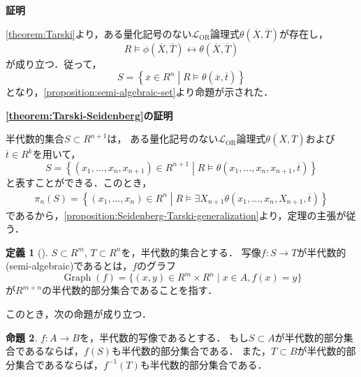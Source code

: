\documentclass[uplatex, dvipdfmx]{jsarticle}
\makeatletter
\numberwithin{equation}{section}
\renewenvironment{proof}[1][\proofname]{\par
  \pushQED{\qed}%
  \normalfont \topsep6\p@\@plus6\p@\relax
  \trivlist
  \item\relax
  {\bfseries
  #1\@addpunct{.}}\hspace\labelsep\ignorespaces
}{
  \popQED\endtrivlist\@endpefalse
}
\newcommand{\map}[3]{{#1}\colon{#2}\rightarrow{#3}}
\DeclareMathOperator{\Graph}{Graph}
\theoremstyle{definition}
\newtheorem{definition}{定義}[section]
\newtheorem{proposition}[definition]{命題}
\renewcommand{\proofname}{\textbf{証明}}
\makeatother
\begin{document}
\begin{proof}
     \cref{theorem:Tarski}より，ある量化記号のない$\mathcal{L}_\mathrm{OR}$論理式$\theta\left(\overline{X}, \overline{T}\right)$が存在し，
     \begin{equation}
          R \models \phi\left(\overline{X},\overline{T}\right) \leftrightarrow \theta\left(\overline{X}, \overline{T}\right)
     \end{equation}
     が成り立つ．従って，
     \begin{equation}
          S = \left\{ \overline{x} \in R^n \middle| R \models \theta(\overline{x}, \overline{t}) \right\}
     \end{equation}
     となり，\cref{proposition:semi-algebraic-set}より命題が示された．
\end{proof}

\begin{proof}[\cref{theorem:Tarski-Seidenberg}の証明]
     半代数的集合$S \subset R^{n+1}$は，
     ある量化記号のない$\mathcal{L}_\mathrm{OR}$論理式$\theta\left(\overline{X}, \overline{T}\right)$および$\overline{t} \in R^k$を用いて，
     \begin{equation}
          S = \left\{(x_1, \dots, x_n, x_{n+1}) \in R^{n+1} \middle| R \models \theta\left(x_1, \dots, x_n, x_{n+1}, \overline{t}\right)\right\}
     \end{equation}
     と表すことができる．このとき，
     \begin{align}
          \pi_n(S) = \left\{(x_1, \dots, x_n) \in R^n \middle|  R \models \exists X_{n+1} \theta\left(x_1, \dots, x_n, X_{n+1}, \overline{t}\right)\right\}
     \end{align}
     であるから，\cref{proposition:Seidenberg-Tarski-generalization}より，定理の主張が従う．
\end{proof}

\begin{definition}[{\cite[Definition 2.2.5]{MR1659509}}]
     $S \subset R^m$, $T \subset R^n$を，半代数的集合とする．
     写像$\map{f}{S}{T}$が半代数的(semi-algebraic)であるとは，$f$のグラフ
     \begin{equation}
          \Graph(f) = \{(x, y) \in R^m \times R^n \mid x \in A, f(x) = y\}
     \end{equation}
     が$R^{m+n}$の半代数的部分集合であることを指す．
\end{definition}

このとき，次の命題が成り立つ．

\begin{proposition}\label{proposition:image-preimage}
     $\map{f}{A}{B}$を，半代数的写像であるとする．
     もし$S \subset A$が半代数的部分集合であるならば，$f(S)$も半代数的部分集合である．
     また，$T \subset B$が半代数的部分集合であるならば，$f^{-1}(T)$も半代数的部分集合である．
\end{proposition}
\end{document}
